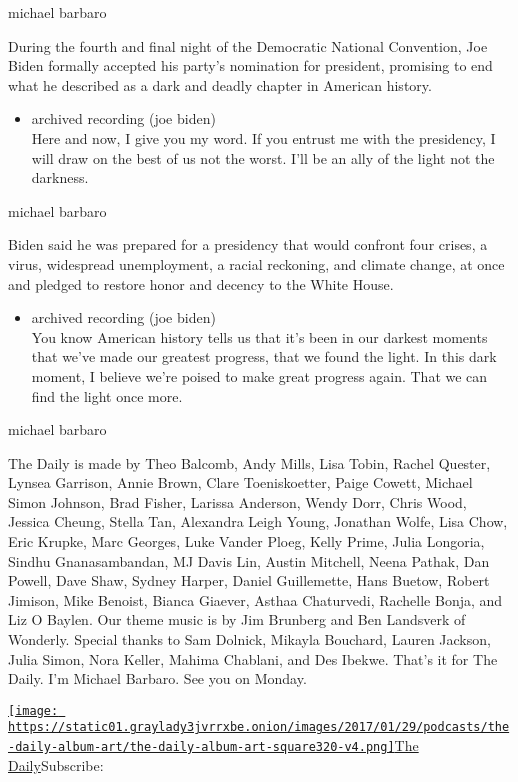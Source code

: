 michael barbaro

During the fourth and final night of the Democratic National Convention,
Joe Biden formally accepted his party's nomination for president,
promising to end what he described as a dark and deadly chapter in
American history.

\begin{itemize}
\tightlist
\item
  archived recording (joe biden)\\
  Here and now, I give you my word. If you entrust me with the
  presidency, I will draw on the best of us not the worst. I'll be an
  ally of the light not the darkness.
\end{itemize}

michael barbaro

Biden said he was prepared for a presidency that would confront four
crises, a virus, widespread unemployment, a racial reckoning, and
climate change, at once and pledged to restore honor and decency to the
White House.

\begin{itemize}
\tightlist
\item
  archived recording (joe biden)\\
  You know American history tells us that it's been in our darkest
  moments that we've made our greatest progress, that we found the
  light. In this dark moment, I believe we're poised to make great
  progress again. That we can find the light once more.
\end{itemize}

michael barbaro

The Daily is made by Theo Balcomb, Andy Mills, Lisa Tobin, Rachel
Quester, Lynsea Garrison, Annie Brown, Clare Toeniskoetter, Paige
Cowett, Michael Simon Johnson, Brad Fisher, Larissa Anderson, Wendy
Dorr, Chris Wood, Jessica Cheung, Stella Tan, Alexandra Leigh Young,
Jonathan Wolfe, Lisa Chow, Eric Krupke, Marc Georges, Luke Vander Ploeg,
Kelly Prime, Julia Longoria, Sindhu Gnanasambandan, MJ Davis Lin, Austin
Mitchell, Neena Pathak, Dan Powell, Dave Shaw, Sydney Harper, Daniel
Guillemette, Hans Buetow, Robert Jimison, Mike Benoist, Bianca Giaever,
Asthaa Chaturvedi, Rachelle Bonja, and Liz O Baylen. Our theme music is
by Jim Brunberg and Ben Landsverk of Wonderly. Special thanks to Sam
Dolnick, Mikayla Bouchard, Lauren Jackson, Julia Simon, Nora Keller,
Mahima Chablani, and Des Ibekwe. That's it for The Daily. I'm Michael
Barbaro. See you on Monday.

\href{https://www.nytimes3xbfgragh.onion/column/the-daily}{\texttt{[image: https://static01.graylady3jvrrxbe.onion/images/2017/01/29/podcasts/the-daily-album-art/the-daily-album-art-square320-v4.png]}The
Daily}Subscribe:

